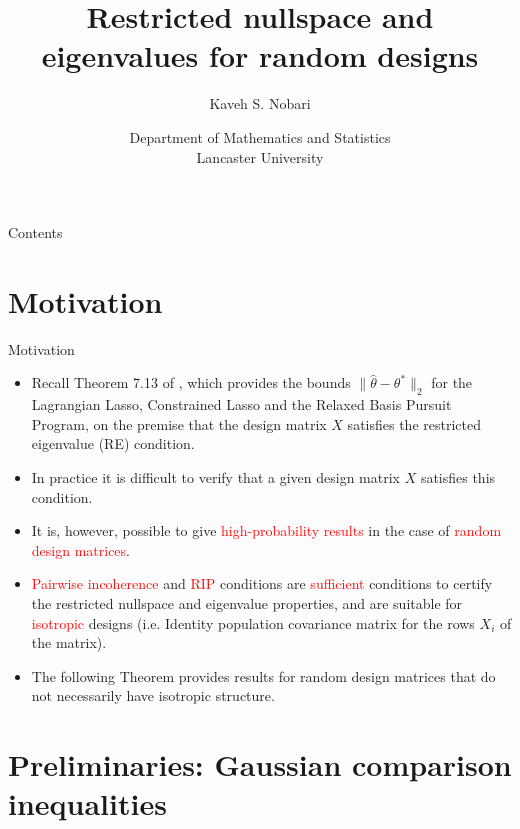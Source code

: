 \documentclass[10pt,handout,english]{beamer}
\title[]{Restricted nullspace and eigenvalues for random designs}
\author[Kaveh S. Nobari]{Kaveh S. Nobari}
\institute[]{Lectures in High-Dimensional Statistics}
\date[27/10/2020]
{Department of Mathematics and Statistics\\ Lancaster University}
\begin{document}
\begin{frame}
\titlepage
\end{frame}

\begin{frame}{Contents}
\tableofcontents
\end{frame}
\section{Motivation}
\begin{frame}[allowframebreaks]{Motivation}
\begin{itemize}
\item Recall Theorem 7.13 of \citet{wainwright2019high}, which provides the bounds $\lVert\hat{\theta}-\theta^*\rVert_2$ for the Lagrangian Lasso, Constrained Lasso and the Relaxed Basis Pursuit Program, on the premise that the design matrix $X$ satisfies the restricted eigenvalue (RE) condition.\justifying
\item In practice it is difficult to verify that a given design matrix $X$ satisfies this condition.\justifying
\item It is, however, possible to give \textcolor{red}{high-probability results} in the case of \textcolor{red}{random design matrices}.\justifying
\item \textcolor{red}{Pairwise incoherence} and \textcolor{red}{RIP} conditions are \textcolor{red}{sufficient} conditions to certify the restricted nullspace and eigenvalue properties, and are suitable for \textcolor{red}{isotropic} designs (i.e. Identity population covariance matrix for the rows $X_i$ of the matrix).
\item The following Theorem provides results for random design matrices that do not necessarily have isotropic structure.
\end{itemize}  
\end{frame}

\section{Preliminaries: Gaussian comparison inequalities}
\end{document}

